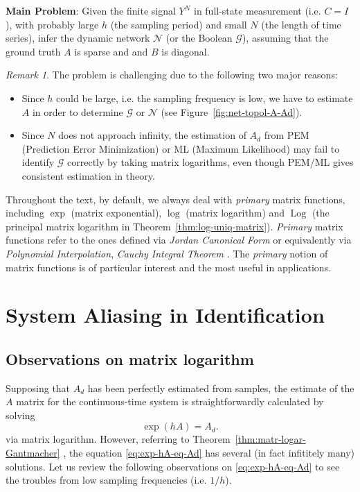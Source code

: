 \documentclass[letterpaper,10pt,journal,final]{IEEEtran}
\theoremstyle{definition}
\theoremstyle{remark}
\newtheorem{remark}{Remark}
\newcommand{\Log}{\operatorname{Log}}
\begin{document}
\smallskip
\noindent\textbf{Main Problem}:
Given the finite signal $Y^N$ in full-state measurement (i.e. $C=I$), with probably
large $h$ (the sampling period) and small $N$ (the length of time series), infer the
dynamic network $\mathcal{N}$ (or the Boolean $\mathcal{G}$), assuming that the
ground truth $A$ is sparse and and $B$ is diagonal.
\medskip

\begin{remark}
  \label{rmk:prob-hard-two-reasons}
  The problem is challenging due to the following two major reasons:
  \begin{itemize}
  \item Since $h$ could be large, i.e. the sampling frequency is low, we have to
    estimate $A$ in order to determine $\mathcal{G}$ or $\mathcal{N}$ (see
    Figure~\ref{fig:net-topol-A-Ad}).
  \item Since $N$ does not approach infinity, the estimation of $A_d$ from PEM
    (Prediction Error Minimization) or ML (Maximum Likelihood) may fail to
    identify $\mathcal{G}$ correctly by taking matrix logarithms, even though
    PEM/ML gives consistent estimation in theory.
\end{itemize}
\end{remark}

Throughout the text, by default, we always deal with \emph{primary} matrix functions,
including $\exp$ (matrix exponential), $\log$ (matrix logarithm) and $\Log$ (the
principal matrix logarithm in Theorem~\ref{thm:log-uniq-matrix}). \emph{Primary}
matrix functions refer to the ones defined via \emph{Jordan Canonical Form} or
equivalently via \emph{Polynomial Interpolation}, \emph{Cauchy Integral Theorem}
\cite[chap.~1]{Higham2008}. The \emph{primary} notion of matrix functions is of
particular interest and the most useful in applications\cite{Higham2008,Horn2003}.



\section{System Aliasing in Identification}
\label{sec:syst-alias-sysid}

\subsection{Observations on matrix logarithm}
\label{subsec:ambig-matrix-log}

Supposing that ${A}_d$ has been perfectly estimated from samples, the estimate of the
$A$ matrix for the continuous-time system is straightforwardly calculated by solving
\begin{equation}
  \label{eq:exp-hA-eq-Ad}
  \exp(h {A}) ={A}_d.
\end{equation}
via matrix logarithm.  However, referring to Theorem~\ref{thm:matr-logar-Gantmacher}
\cite{Higham2008}, the equation \eqref{eq:exp-hA-eq-Ad} has several (in fact infititely many)
solutions. Let us review the following observations on \eqref{eq:exp-hA-eq-Ad} to see
the troubles from low sampling frequencies (i.e. $1/h$).
\end{document}
